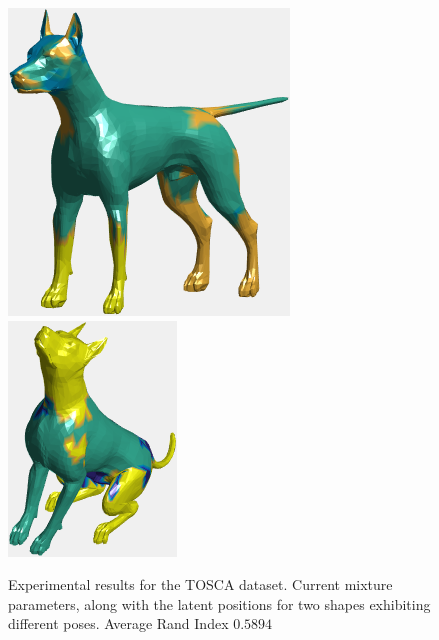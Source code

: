 \documentclass[]{article}
\begin{document}
\begin{figure}[ht!]
	\centering
	
	\includegraphics[width=0.43\linewidth]{img/dogMVWMM100Nexp2}
	\includegraphics[width=0.34\linewidth]{img/dogMVWMM100Nexp2b}\\
	\caption{Experimental results for the TOSCA dataset. Current mixture parameters, along with the latent positions for two shapes exhibiting different poses. Average Rand Index $0.5894$ }
\end{figure}
\end{document}
